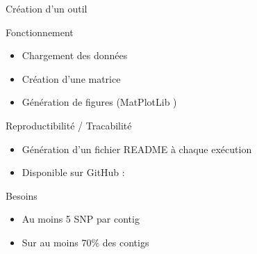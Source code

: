 \begin{frame}{Création d'un outil}
    \begin{block}{Fonctionnement}
        \begin{itemize}
            \item Chargement des données
            \item Création d'une matrice
            \item Génération de figures (MatPlotLib \cite{matplotlib})
        \end{itemize}
    \end{block}

    \begin{block}{Reproductibilité / Tracabilité}
        \begin{itemize}
            \item Génération d'un fichier README à chaque exécution
            \item Disponible sur GitHub : \cite{florent_f-marchalm1bioinfointernship2024-inrae_agap_ge2pop_2024}
        \end{itemize}
    \end{block}

    \begin{alertblock}{Besoins}
        \begin{itemize}
            \small
            \item Au moins 5 SNP par contig
            \item Sur au moins 70\% des contigs
        \end{itemize}
    \end{alertblock}


    
\end{frame}
